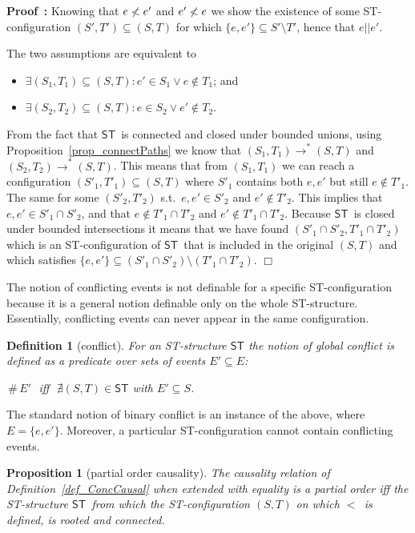 \documentclass[submission,copyright,creativecommons]{eptcs}
\newtheorem{proposition}[theorem]{Proposition}
\newtheorem{definition}[theorem]{Definition}
\newenvironment{proof}[1][\!\!\,]{\vspace{1ex}\noindent\textbf{Proof #1: }}{\hfill$\Box$\vspace{2ex}}
\newcommand\conflict{\ensuremath{\,\#\,}}
\newcommand\ST{\ensuremath{\mathsf{ST}}}
\newcommand\concurr{\ensuremath{||}}
\newcommand\causes{\ensuremath{<}}
\newcommand{\transition}[1]{\ensuremath{\xrightarrow{#1}}}
\begin{document}
\begin{proof}
Knowing that $e\not\causes e'$ and $e'\not\causes e$ we show the existence of some ST-configuration $(S',T')\subseteq(S,T)$ for which $\{e,e'\}\subseteq S'\setminus T'$, hence that $e\concurr e'$.

The two assumptions are equivalent to 
\begin{itemize}
\item $\exists (S_{1},T_{1})\subseteq(S,T):e'\in S_{1} \vee e\not\in T_{1}$; and
\item $\exists (S_{2},T_{2})\subseteq(S,T):e\in S_{2} \vee e'\not\in T_{2}$.
\end{itemize}
From the fact that \ST\ is connected and closed under bounded unions, using Proposition~\ref{prop_connectPaths} we know that $(S_{1},T_{1})\transition{}^{*}(S,T)$ and $(S_{2},T_{2})\transition{}^{*}(S,T)$. This means that from $(S_{1},T_{1})$ we can reach a configuration $(S'_{1},T'_{1})\subseteq (S,T)$ where $S'_{1}$ contains both $e,e'$ but still $e\not\in T'_{1}$. The same for some $(S'_{2},T'_{2})$ s.t.\ $e,e'\in S'_{2}$ and $e'\not\in T'_{2}$. This implies that $e,e'\in S'_{1}\cap S'_{2}$, and that $e\not\in T'_{1}\cap T'_{2}$ and $e'\not\in T'_{1}\cap T'_{2}$. Because \ST\ is closed under bounded intersections it means that we have found $(S'_{1}\cap S'_{2},T'_{1}\cap T'_{2})$ which is an ST-configuration of \ST\ that is included in the original $(S,T)$ and which satisfies $\{e,e'\}\subseteq (S'_{1}\cap S'_{2})\setminus(T'_{1}\cap T'_{2})$.
\end{proof}


The notion of conflicting events is not definable for a specific ST-configuration because it is a general notion definable only on the whole ST-structure. Essentially, conflicting events can never appear in the same configuration.

\begin{definition}[conflict]\label{def_conflict}
For an ST-structure $\ST$ the notion of \emph{global conflict} is defined as a predicate over sets of events $E'\!\subseteq\! E$: 

\centerline{$\conflict\!E'$\,\ iff\ \,$\nexists(S,T)\!\in\!\mathsf{ST}$ with $E'\subseteq S$.}
\end{definition}

The standard notion of binary conflict is an instance of the above, where $E=\{e,e'\}$.
Moreover, a particular ST-configuration cannot contain conflicting events.


\begin{proposition}[partial order causality]\label{prop_partialOrderCausality}
The causality relation of Definition~\ref{def_ConcCausal} when extended with equality is a partial order iff the ST-structure \ST\ from which the ST-configuration $(S,T)$ on which \causes\ is defined, is rooted and connected.
\end{proposition}
\end{document}
